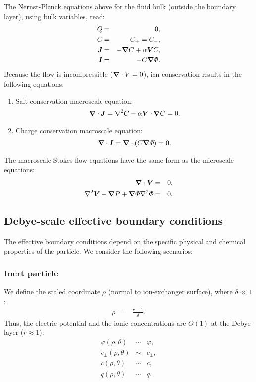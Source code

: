 The Nernst-Planck equations above for the fluid bulk (outside
the boundary layer), using bulk variables, read:
\begin{eqnarray}
  Q & = & 0, \\
  C & = & C_+ = C_-, \\
\boldsymbol{J} &=& -\boldsymbol{\nabla} C + \alpha \boldsymbol{V} C, \\
\boldsymbol{I} &=& -C \boldsymbol{\nabla} \varPhi.
\end{eqnarray}
Because the flow is incompressible ($\boldsymbol{\nabla} \cdot V = 0$), 
ion conservation results in the following equations:

\begin{enumerate}
\item Salt conservation macroscale equation:
\begin{eqnarray}
\boldsymbol{\nabla} \cdot \boldsymbol{J} = \nabla^2 C - \alpha \boldsymbol{V} \cdot \boldsymbol{\nabla} C = 0. 
\end{eqnarray}

\item Charge conservation macroscale equation:
\begin{eqnarray}
\boldsymbol{\nabla} \cdot \boldsymbol{I} = \boldsymbol{\nabla} \cdot \left( C \boldsymbol{\nabla} \varPhi \right) = 0.
\end{eqnarray}
\end{enumerate}

The macroscale Stokes flow equations have the same form as the microscale equations:
\begin{eqnarray}
\boldsymbol{\nabla} \cdot \boldsymbol{V} &=& 0, \\
\nabla^2 \boldsymbol{V} - \boldsymbol{\nabla} P + \boldsymbol{\nabla} \varPhi \nabla^2 \varPhi &=& 0.
\end{eqnarray}

\subsection{Debye-scale effective boundary conditions}
The effective boundary conditions depend on the specific physical and chemical properties 
of the particle. We consider the following scenarios:

\subsubsection{Inert particle}

We define the scaled coordinate $\rho$ (normal to ion-exchanger surface), where $\delta \ll 1$:
\begin{eqnarray}
  \rho &=& \frac{r-1}{\delta}. 
\end{eqnarray}
Thus, the electric potential and the ionic concentrations are $O(1)$ at the Debye layer ($r \approx 1$):
\begin{eqnarray}
  \varphi(\rho,\theta) &\sim& \varphi, \\
  c_\pm(\rho,\theta) &\sim& c_\pm, \\
  c(\rho,\theta) &\sim& c, \\
  q(\rho,\theta) &\sim& q.
\end{eqnarray}

